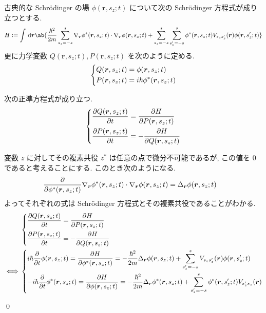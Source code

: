 \documentclass[uplatex,dvipdfmx,a4paper,11pt]{jlreq}
\makeatletter
\newcommand{\rr}{\bm{r}}
\numberwithin{equation}{section}
\theoremstyle{definition}
\renewenvironment{proof}[1][\proofname]{\par
  \normalfont
  \topsep6\p@\@plus6\p@ \trivlist
  \item[\hskip\labelsep{\bfseries #1}\@addpunct{\bfseries}]\ignorespaces\quad\par
}{
  \qed\endtrivlist\@endpefalse
}
\renewcommand\proofname{証明}
\makeatother
\begin{document}
\begin{definition}
  古典的な Schrödinger の場 $\phi(\rr, s_z; t)$ について次の Schrödinger 方程式が成り立つとする.
  \begin{align}
    H := \int\dl{\rr}\ab\{\frac{\hbar^2}{2m}\sum_{s_z = -s}^{s}\nabla_{\rr}\phi^*(\rr, s_z; t)\cdot\nabla_{\rr}\phi(\rr, s_z; t) + \sum_{s_z = -s}^{s}\sum_{s_z' = -s}^{s}\phi^*(\rr, s_z; t)V_{s_zs_z'}(\rr)\phi(\rr, s_z'; t)\}
  \end{align}
  更に力学変数 $Q(\rr, s_z; t), P(\rr, s_z; t)$ を次のように定める.
  \begin{align}
    \begin{dcases}
      Q(\rr, s_z; t) = \phi(\rr, s_z; t) \\
      P(\rr, s_z; t) = i\hbar\phi^*(\rr, s_z; t)
    \end{dcases}
  \end{align}
\end{definition}
\begin{theorem}[Q21-99(i)(ii)]
  次の正準方程式が成り立つ.
  \begin{align}
    \begin{dcases}
      \diffp{Q(\rr, s_z; t)}{t} = \diffp{H}{{P(\rr, s_z; t)}} \\
      \diffp{P(\rr, s_z; t)}{t} = -\diffp{H}{{Q(\rr, s_z; t)}}
    \end{dcases}
  \end{align}
\end{theorem}
\begin{proof}
  変数 $z$ に対してその複素共役 $z^*$ は任意の点で微分不可能であるが, この値を $0$ であると考えることにする.
  このとき次のようになる.
  \begin{align}
    \diffp{}{{\phi^*(\rr, s_z; t)}}\nabla_{\rr}\phi^*(\rr, s_z; t)\cdot\nabla_{\rr}\phi(\rr, s_z; t) & = \Delta_{\rr}\phi(\rr, s_z; t)
  \end{align}
  よってそれぞれの式は Schrödinger 方程式とその複素共役であることがわかる.
  \begin{align}
     & \begin{dcases}
         \diffp{Q(\rr, s_z; t)}{t} = \diffp{H}{{P(\rr, s_z; t)}} \\
         \diffp{P(\rr, s_z; t)}{t} = -\diffp{H}{{Q(\rr, s_z; t)}}
       \end{dcases}                                                                                                                            \\
    \iff
     & \begin{dcases}
         i\hbar\diffp{}{t}\phi(\rr, s_z; t) = \diffp{H}{{\phi^*(\rr, s_z; t)}} = -\frac{\hbar^2}{2m}\Delta_{\rr}\phi(\rr, s_z; t) + \sum_{s_z' = -s}^{s}V_{s_zs_z'}(\rr)\phi(\rr, s_z'; t) \\
         -i\hbar\diffp{}{t}\phi^*(\rr, s_z; t) = \diffp{H}{{\phi(\rr, s_z; t)}} = -\frac{\hbar^2}{2m}\Delta_{\rr}\phi^*(\rr, s_z; t) + \sum_{s_z' = -s}^{s}\phi^*(\rr, s_z'; t)V_{s_z's_z}(\rr)
       \end{dcases}
  \end{align}
\end{proof}
\end{document}
